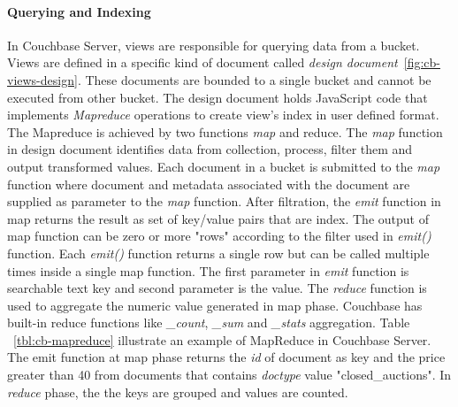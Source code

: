 \paragraph{Querying and Indexing}
In Couchbase Server,  views are responsible for querying data from a bucket. Views are defined in a specific kind of document called \textit{design document}~\ref{fig:cb-views-design}. These documents are bounded to a single bucket and cannot be executed from other bucket. The design document holds JavaScript code that implements \textit{Mapreduce} operations to create view's index in user defined format. The Mapreduce is achieved by two functions \textit{map} and reduce. 
The \textit{map} function in design document identifies data from collection, process, filter them and output transformed values. Each document in a bucket is submitted to the \textit{map } function where document and metadata associated with the document are supplied as parameter to the \textit{map} function. After filtration, the \textit{emit} function in map returns the result as set of key/value pairs that are index. The output of map function can be zero or more "rows" according to the filter used in \textit{emit()} function. Each \textit{emit()} function returns a single row but can be called multiple times inside a single map function. The first parameter in \textit{emit} function is searchable text key and second parameter is the value.
The \textit{reduce} function is used to aggregate the numeric value generated in map phase. Couchbase has built-in reduce functions like \textit{\_count}, \textit{\_sum} and \textit{\_stats} aggregation. Table ~\ref{tbl:cb-mapreduce} illustrate an example of MapReduce  in Couchbase Server. The emit function at map phase returns the \textit{id} of document  as key and the price greater than 40 from documents that contains \textit{doctype} value "closed\_auctions". In \textit{reduce} phase, the the keys are grouped and values are counted.


